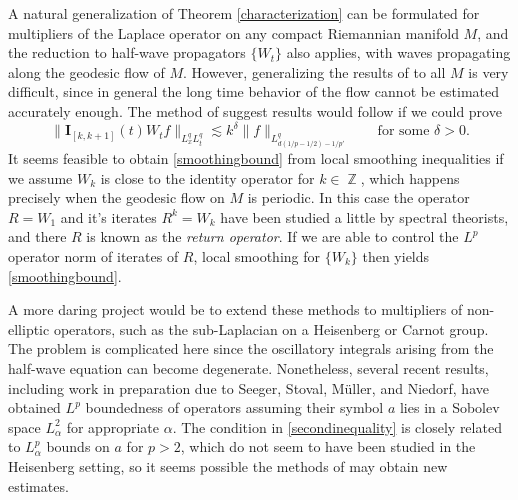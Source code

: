 \documentclass[11pt]{article}
\theoremstyle{definition}
\DeclareMathOperator{\ZZ}{\mathbb{Z}}
\begin{document}
A natural generalization of Theorem \ref{characterization} can be formulated for multipliers of the Laplace operator on any compact Riemannian manifold $M$, and the reduction to half-wave propagators $\{ W_t \}$ also applies, with waves propagating along the geodesic flow of $M$.
However, generalizing the results of \cite{DensonCharacterization} to all $M$ is very difficult, since in general the long time behavior of the flow cannot be estimated accurately enough. The method of \cite{DensonCharacterization} suggest results would follow if we could prove
%
\begin{equation} \label{smoothingbound}
    \| \mathbf{I}_{[k,k+1]}(t) W_t f \|_{L^q_x L^q_t} \lesssim k^\delta \| f \|_{L^q_{d(1/p - 1/2) - 1/p'}} \quad\quad\text{for some $\delta > 0$.}
\end{equation}
%
It seems feasible to obtain \eqref{smoothingbound} from local smoothing inequalities if we assume $W_k$ is close to the identity operator for $k \in \ZZ$, which happens precisely when the geodesic flow on $M$ is periodic. %
In this case the operator $R = W_1$ and it's iterates $R^k = W_k$ have been studied a little by spectral theorists, and there $R$ is known as the \emph{return operator}. If we are able to control the $L^p$ operator norm of iterates of $R$, local smoothing for $\{ W_k \}$ then yields \eqref{smoothingbound}. 

A more daring project would be to extend these methods to multipliers of non-elliptic operators, such as the sub-Laplacian on a Heisenberg or Carnot group. The problem is complicated here since the oscillatory integrals arising from the half-wave equation can become degenerate. Nonetheless, several recent results, including work in preparation due to Seeger, Stoval, M\"{u}ller, and Niedorf, have obtained $L^p$ boundedness of operators assuming their symbol $a$ lies in a Sobolev space $L^2_\alpha$ for appropriate $\alpha$. The condition in \eqref{secondinequality} is closely related to $L^p_\alpha$ bounds on $a$ for $p > 2$, which do not seem to have been studied in the Heisenberg setting, so it seems possible the methods of \cite{DensonCharacterization} may obtain new estimates.
\end{document}
